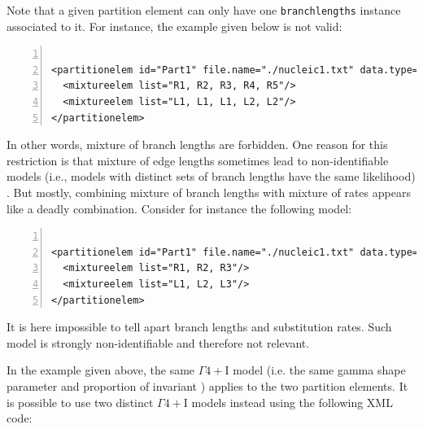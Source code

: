 \documentclass[a4paper,12pt]{article}
\begin{document}
Note that  a given partition element  can only have  one {\tt branchlengths} instance  associated to
it. For instance, the example given below is not valid:

\vspace{0.2cm}
\begin{Verbatim}[frame=single, label=Invalid mixture, samepage=true, baselinestretch=0.5,
  fontsize=\small, numbers=left]

<partitionelem id="Part1" file.name="./nucleic1.txt" data.type="nt">
  <mixtureelem list="R1, R2, R3, R4, R5"/>
  <mixtureelem list="L1, L1, L1, L2, L2"/>
</partitionelem>

\end{Verbatim}

In other words, mixture of branch lengths are forbidden. One reason for this restriction is that
mixture of edge lengths sometimes lead to non-identifiable models (i.e., models with distinct sets
of branch lengths have the same likelihood) \cite{matsen07}. But mostly, combining mixture of branch
lengths with mixture of rates appears like a deadly combination. Consider for instance the following model:

\vspace{0.2cm}
\begin{Verbatim}[frame=single, label=Invalid mixture, samepage=true, baselinestretch=0.5,
  fontsize=\small, numbers=left]

<partitionelem id="Part1" file.name="./nucleic1.txt" data.type="nt">
  <mixtureelem list="R1, R2, R3"/>
  <mixtureelem list="L1, L2, L3"/>
</partitionelem>

\end{Verbatim}

It is here impossible to tell apart  branch lengths and substitution rates. Such model is strongly
non-identifiable and therefore not relevant.

In the example given above, the same $\Gamma4+$I model (i.e. the same gamma shape parameter and
proportion of invariant ) applies to the two partition elements. It is possible to use two distinct
$\Gamma4+$I models instead using the following XML code:
\end{document}
